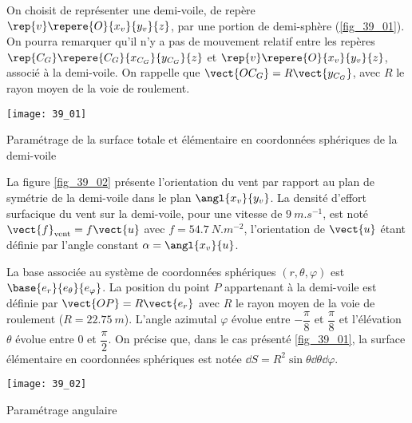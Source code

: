 \normaltrue \difficilefalse \tdifficilefalse
\correctionfalse


\setcounter{question}{0}%
\ifcorrection
\else
{}
\fi

\ifprof
\else
On choisit de représenter une demi-voile, de repère $\rep{v}\repere{O}{x_v}{y_v}{z}$, par une portion de demi-sphère (\autoref{fig_39_01}).
On pourra remarquer qu’il n’y a pas de mouvement relatif entre les repères $\rep{C_G}\repere{C_G}{x_{C_G}}{y_{C_G}}{z}$ et $\rep{v}\repere{O}{x_v}{y_v}{z}$, 
associé à la demi-voile. On rappelle que $\vect{OC_G}=R\vect{y_{C_G}}$, avec $R$ le rayon moyen de la voie de roulement.


\begin{marginfigure}
\centering
\texttt{[image: 39\_01]}
\caption{Paramétrage de la surface totale et élémentaire en coordonnées sphériques de la demi-voile \label{fig_39_01}}
\end{marginfigure}

La figure \autoref{fig_39_02} présente l’orientation du vent par rapport au plan de symétrie de la demi-voile dans le plan $\angl{x_v}{y_v}$. La densité d’effort surfacique du vent sur la demi-voile, pour une vitesse de $\SI{9}{m.s^{-1}}$, est noté $\vect{f}_{\text{vent}}=f\vect{u}$ avec $f=\SI{54,7}{N.m^{-2}}$, l’orientation de $\vect{u}$ étant définie par l’angle constant $\alpha=\angl{x_v}{u}$.

La base associée au système de coordonnées sphériques $\left(r,\theta,\varphi\right)$ est $\base{e_r}{e_{\theta}}{e_{\varphi}}$. La position du point $P$ appartenant
à la demi-voile est définie par $\vect{OP}=R\vect{e_r}$ avec $R$ le rayon moyen de la voie de roulement ($R=\SI{22,75}{m}$).
L’angle azimutal $\varphi$ évolue entre $-\dfrac{\pi}{8}$ et $\dfrac{\pi}{8}$ et l’élévation $\theta$ évolue entre 0 et $\dfrac{\pi}{2}$.
On précise que, dans le cas présenté \autoref{fig_39_01}, la surface élémentaire en coordonnées sphériques est notée
$\dd S =R^2 \sin \theta \dd\theta \dd \varphi$.


\begin{marginfigure}
\centering
\texttt{[image: 39\_02]}
\caption{Paramétrage angulaire \label{fig_39_02}}
\end{marginfigure}

